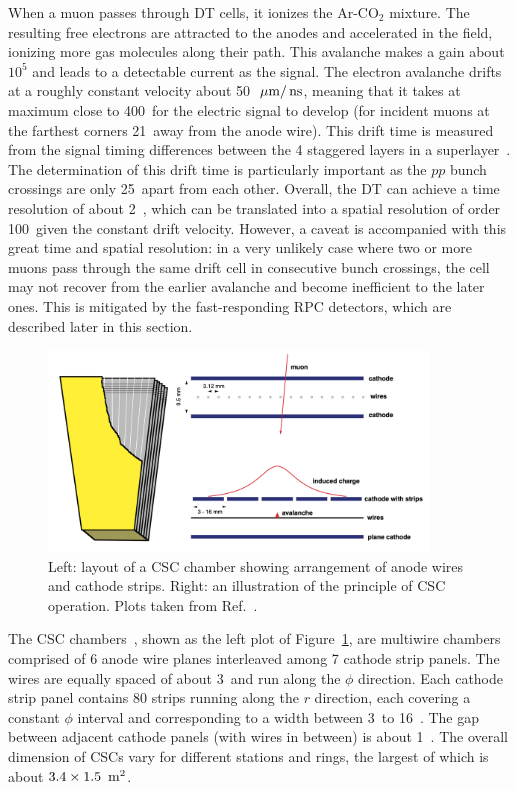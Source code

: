 When a muon passes through DT cells, it ionizes the $\text{Ar-CO}_{2}$ mixture. 
The resulting free electrons are attracted to the anodes and accelerated in the field, ionizing more gas molecules along their path.
This avalanche makes a gain about $10^5$ and leads to a detectable current as the signal.
The electron avalanche drifts at a roughly constant velocity about 50~$\mum/\ns$, 
meaning that it takes at maximum close to 400~\ns for the electric signal to develop 
(for incident muons at the farthest corners 21~\mm away from the anode wire).
This drift time is measured from the signal timing differences between the 4 staggered layers in a superlayer~\cite{ARCE2004441}.
The determination of this drift time is particularly important as the $pp$ bunch crossings are only 25~\ns apart from each other.
Overall, the DT can achieve a time resolution of about 2~\ns,
which can be translated into a spatial resolution of order 100~\mum given the constant drift velocity.
However, a caveat is accompanied with this great time and spatial resolution: 
in a very unlikely case where two or more muons pass through the same drift cell in consecutive bunch crossings,
the cell may not recover from the earlier avalanche and become inefficient to the later ones.
This is mitigated by the fast-responding RPC detectors, which are described later in this section.

\begin{figure}[!htb]
    \centering
    \includegraphics[width=0.90\textwidth]{pics/LHC_CMS/CSC.png}
    \caption{Left: layout of a CSC chamber showing arrangement of anode wires and cathode strips.
             Right: an illustration of the principle of CSC operation.
             Plots taken from Ref.~\cite{collaboration_2013}.}
    \label{fig:cms_csc}
\end{figure}

The CSC chambers~\cite{Collaboration_2008, collaboration_2013}, shown as the left plot of Figure~\ref{fig:cms_csc}, are multiwire chambers comprised of 6 anode wire planes interleaved among 7 cathode strip panels.
The wires are equally spaced of about 3~\mm and run along the $\phi$ direction.  
Each cathode strip panel contains 80 strips running along the $r$ direction, each covering a constant $\phi$ interval and corresponding to a width between 3~\mm to 16~\mm. 
The gap between adjacent cathode panels (with wires in between) is about 1~\cm.  
The overall dimension of CSCs vary for different stations and rings, the largest of which is about $3.4 \times 1.5~\meter^{2}$.

